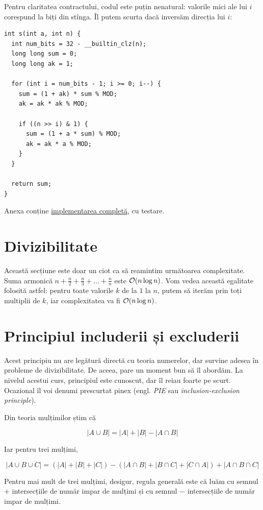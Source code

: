 \documentclass[../main.tex]{subfiles}
\begin{document}
Pentru claritatea contractului, codul este puțin nenatural: valorile mici ale lui $i$ corespund la biți din stînga. Îl putem scurta dacă inversăm direcția lui $i$:

\begin{verbatim}
int s(int a, int n) {
  int num_bits = 32 - __builtin_clz(n);
  long long sum = 0;
  long long ak = 1;

  for (int i = num_bits - 1; i >= 0; i--) {
    sum = (1 + ak) * sum % MOD;
    ak = ak * ak % MOD;

    if ((n >> i) & 1) {
      sum = (1 + a * sum) % MOD;
      ak = ak * a % MOD;
    }
  }

  return sum;
}
\end{verbatim}

\label{problem:progression-sum}

Anexa conține \hyperref[code:progression-sum]{implementarea completă}, cu testare.

\section{Divizibilitate}

Această secțiune este doar un ciot ca să reamintim următoarea complexitate. Suma armonică $n + \frac{n}{2} + \frac{n}{3} + ... + \frac{n}{n}$ este $\mathcal{O}(n \log n)$. Vom vedea această egalitate folosită astfel: pentru toate valorile $k$ de la $1$ la $n$, putem să iterăm prin toți multiplii de $k$, iar complexitatea va fi $\mathcal{O}(n \log n)$.

\section{Principiul includerii și excluderii}

Acest principiu nu are legătură directă cu teoria numerelor, dar survine adesea în probleme de divizibilitate. De aceea, pare un moment bun să îl abordăm. La nivelul acestui curs, principiul este cunoscut, dar îl reiau foarte pe scurt. Ocazional îl voi denumi prescurtat pinex (engl. \textit {PIE} sau \textit{inclusion-exclusion principle}).

Din teoria mulțimilor știm că

$$|A \cup B| = |A| + |B| - |A \cap B|$$

Iar pentru trei mulțimi,

$$ | A \cup B \cup C| = (|A| + |B| + |C|) - (|A \cap B| + |B \cap C| + |C \cap A|) + | A \cap B \cap C|$$

Pentru mai mult de trei mulțimi, desigur, regula generală este că luăm cu semnul $+$ intersecțiile de număr impar de mulțimi și cu semnul $-$ intersecțiile de număr impar de mulțimi.
\end{document}
